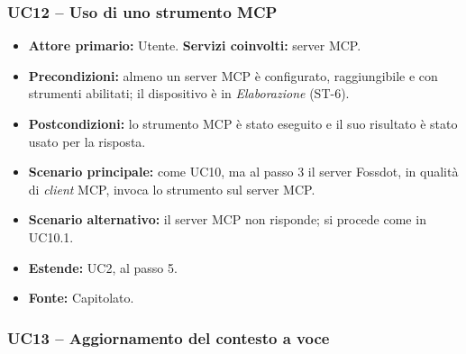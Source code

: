 \documentclass[12pt,a4paper]{article}
\newcommand{\tightlist}{\setlength{\itemsep}{1pt}\setlength{\parskip}{0pt}}
\begin{document}
\subsubsection{UC12 -- Uso di uno strumento MCP}

\begin{itemize}

\tightlist

\item \textbf{Attore primario:} Utente. \textbf{Servizi coinvolti:} server MCP.

\item \textbf{Precondizioni:} almeno un server MCP è configurato, raggiungibile e con strumenti abilitati; il dispositivo è in \emph{Elaborazione} (ST-6).

\item \textbf{Postcondizioni:} lo strumento MCP è stato eseguito e il suo risultato è stato usato per la risposta.

\item \textbf{Scenario principale:} come UC10, ma al passo 3 il server Fossdot, in qualità di \emph{client} MCP, invoca lo strumento sul server MCP.

\item \textbf{Scenario alternativo:} il server MCP non risponde; si procede come in UC10.1.

\item \textbf{Estende:} UC2, al passo 5.

\item \textbf{Fonte:} Capitolato.

\end{itemize}



\subsubsection{UC13 -- Aggiornamento del contesto a voce}
\end{document}
